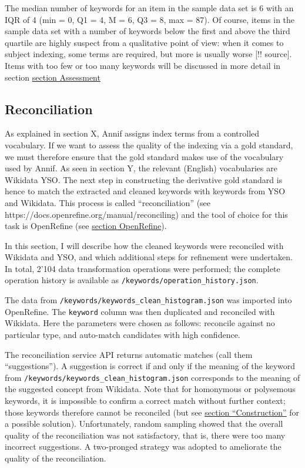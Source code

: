 The median number of keywords for an item in the sample data set is 6
with an IQR of 4 (min = 0, Q1 = 4, M = 6, Q3 = 8, max = 87). Of course,
items in the sample data set with a number of keywords below the first
and above the third quartile are highly suspect from a qualitative point
of view: when it comes to subject indexing, some terms are required, but
more is usually worse {[}!! source{]}. Items with too few or too many
keywords will be discussed in more detail in section
\protect\hyperlink{assessment}{section Assessment}

\hypertarget{reconciliation}{%
\subsection{Reconciliation}\label{reconciliation}}

As explained in section X, Annif assigns index terms from a controlled
vocabulary. If we want to assess the quality of the indexing via a gold
standard, we must therefore ensure that the gold standard makes use of
the vocabulary used by Annif. As seen in section Y, the relevant
(English) vocabularies are Wikidata YSO. The next step in constructing
the derivative gold standard is hence to match the extracted and cleaned
keywords with keywords from YSO and Wikidata. This process is called
``reconciliation'' (see https://docs.openrefine.org/manual/reconciling)
and the tool of choice for this task is OpenRefine (see
\protect\hyperlink{openrefine}{section OpenRefine}).

In this section, I will describe how the cleaned keywords were
reconciled with Wikidata and YSO, and which additional steps for
refinement were undertaken. In total, 2'104 data transformation
operations were performed; the complete operation history is available
as \texttt{/keywords/operation\_history.json}.

The data from \texttt{/keywords/keywords\_clean\_histogram.json} was
imported into OpenRefine. The \texttt{keyword} column was then
duplicated and reconciled with Wikidata. Here the parameters were chosen
as follows: reconcile against no particular type, and auto-match
candidates with high confidence.

The reconciliation service API returns automatic matches (call them
``suggestions''). A suggestion is correct if and only if the meaning of
the keyword from \texttt{/keywords/keywords\_clean\_histogram.json}
corresponds to the meaning of the suggested concept from Wikidata. Note
that for homonymous or polysemous keywords, it is impossible to confirm
a correct match without further context; those keywords therefore cannot
be reconciled (but see \protect\hyperlink{construction}{section
``Construction''} for a possible solution). Unfortunately, random
sampling showed that the overall quality of the reconciliation was not
satisfactory, that is, there were too many incorrect suggestions. A
two-pronged strategy was adopted to ameliorate the quality of the
reconciliation.

